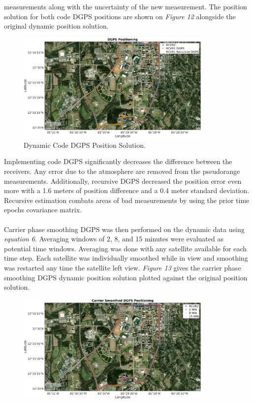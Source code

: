 \documentclass[11pt]{article}
\begin{document}
\begin{enumerate}[label=\textbf{\arabic*.}]
      measurements along with the uncertainty of the new measurement. The position solution 
      for both code DGPS positions are shown on \emph{Figure 12} alongside the original 
      dynamic position solution.
      \begin{figure}[H]
        \centering
        \includegraphics[width=0.85\textwidth]{p3_b.png}
        \caption{Dynamic Code DGPS Position Solution.}
      \end{figure}
      Implementing code DGPS significantly decreases the difference between the receivers. 
      Any error due to the atmosphere are removed from the pseudorange measurements. 
      Additionally, recursive DGPS decreased the position error even more with a 1.6 meters 
      of position difference and a 0.4 meter standard deviation. Recursive estimation combats 
      areas of bad measurements by using the prior time epochs covariance matrix. 
      \\ \\
      Carrier phase smoothing DGPS was then performed on the dynamic data using 
      \emph{equation 6}. Averaging windows of 2, 8, and 15 minutes were evaluated as 
      potential time windows. Averaging was done with any satellite available for each time 
      step. Each satellite was individually smoothed while in view and smoothing was 
      restarted any time the satellite left view. \emph{Figure 13} gives the carrier phase 
      smoothing DGPS dynamic position solution plotted against the original position 
      solution.
      \begin{figure}[H]
        \centering
        \includegraphics[width=0.85\textwidth]{p3_c.png}

\end{figure}
\end{enumerate}
\end{document}
